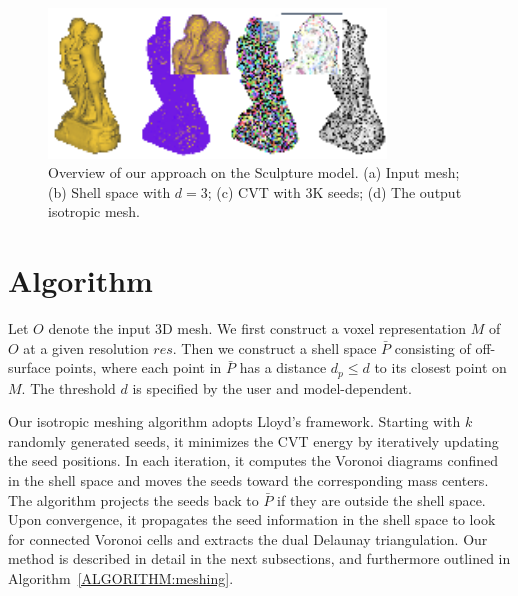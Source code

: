 
\vspace{-0.3cm}



  \begin{figure}[t]
  \centering
  \includegraphics[width=0.8\textwidth]{figs/gcvt/sculpture}
  \vspace{-0.2in}
  \caption{Overview of our approach on the Sculpture model.
  (a) Input mesh; (b) Shell space with $d=3$; (c) CVT with 3K seeds;
  (d) The output isotropic mesh.
  }
  \label{fig:scuplture}
  \end{figure}

\vspace{-0.4cm}

\section{Algorithm}
\label{sub:algorithm}
  Let $O$ denote the input 3D mesh.
  We first construct a voxel representation $M$ of $O$ at a given resolution $res$.
  Then we construct a shell space $\bar{P}$ consisting of off-surface points,
  where each point in $\bar{P}$ has a distance $d_p\leq d$ to its closest point on $M$.
  The threshold $d$ is specified by the user and model-dependent.

  Our isotropic meshing algorithm adopts Lloyd's framework.
  Starting with $k$ randomly generated seeds, it minimizes the CVT energy by iteratively updating the seed positions.
  In each iteration, it computes the Voronoi diagrams confined in the shell space and moves the seeds toward the corresponding mass centers.
  The algorithm projects the seeds back to $\bar{P}$ if they are outside the shell space.
  Upon convergence, it propagates the seed information in the shell space to look for connected Voronoi cells and extracts the dual Delaunay triangulation.
  Our method is described in detail in the next subsections, and furthermore outlined in Algorithm~\ref{ALGORITHM:meshing}.

